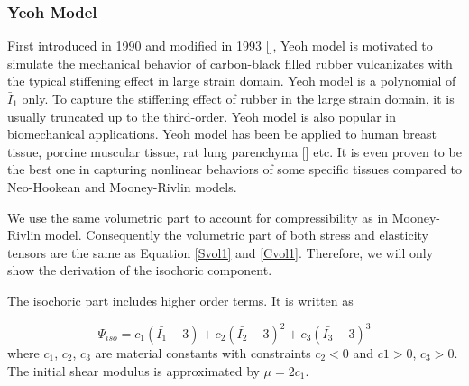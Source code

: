 %
\subsubsection{Yeoh Model}
First introduced in 1990 and modified in 1993 [], Yeoh model is motivated to simulate the mechanical behavior of carbon-black filled rubber vulcanizates with the typical stiffening effect in large strain domain. Yeoh model is a polynomial of $\bar{I}_1$ only.  To capture the stiffening effect of rubber in the large strain domain, it is usually truncated up to the third-order. Yeoh model is also popular in biomechanical applications. Yeoh model has been be applied to human breast tissue, porcine muscular tissue, rat lung parenchyma [] etc. It is even proven to be the best one in capturing nonlinear behaviors of some specific tissues compared to Neo-Hookean and Mooney-Rivlin models.

We use the same volumetric part to account for compressibility as in Mooney-Rivlin model. Consequently the volumetric part of both stress and elasticity tensors are the same as Equation \ref{Svol1} and \ref{Cvol1}. Therefore, we will only show the derivation of the isochoric component.

The isochoric part includes higher order terms. It is written as

\begin{equation} \label{iso2}
\Psi_{iso} = c_1(\bar{I_1} - 3) + c_2(\bar{I_2} - 3)^2 + c_3(\bar{I_3} - 3)^3
\end{equation}
where $c_1$, $c_2$, $c_3$ are material constants with constraints $c_2 < 0$ and $c1 > 0$, $c_3 > 0$. The initial shear modulus is approximated by $\mu = 2c_1$.

